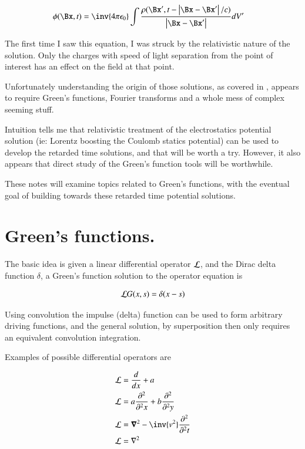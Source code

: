 \begin{align*}
\phi(\Bx, t) &= \inv{4 \pi \epsilon_0} \int \frac{\rho(\Bx', t - \Abs{\Bx-\Bx'}/c)}{\Abs{\Bx - \Bx'}} dV'
\end{align*}

The first time I saw this equation, I was struck by the relativistic nature of the solution.  Only the charges with speed of light separation from the point of interest has an effect on the field at that point.

Unfortunately understanding the origin of those solutions, as covered in \citep{FitzRelEandM}, appears to require Green's functions, Fourier transforms and a whole mess of complex seeming stuff.

Intuition tells me that relativistic treatment of the electrostatics potential solution (ie: Lorentz boosting the Coulomb statics potential) can be used to develop the retarded time solutions, and that will be worth a try.  However, it also appears that direct study of the Green's function tools will be worthwhile.

These notes will examine topics related to Green's functions, with the eventual goal of building towards these retarded time potential solutions.

\section{Green's functions. }

The basic idea is given a linear differential operator $\mathcal{L}$, and the Dirac delta function $\delta$, a Green's function solution to the operator equation is

\begin{align*}
\mathcal{L} G(x,s) = \delta(x-s)
\end{align*}

Using convolution the impulse (delta) function can be used to form arbitrary driving functions, and the general solution, by superposition then only requires an equivalent convolution integration.

Examples of possible differential operators are

\begin{align*}
\LL &= \frac{d}{dx} + a \\
\LL &= a \PDsq{x}{} + b \PDsq{y}{} \\
\LL &= \spacegrad^2 - \inv{v^2}\PDsq{t}{}\\
\LL &= \grad^2 \\
\end{align*}

